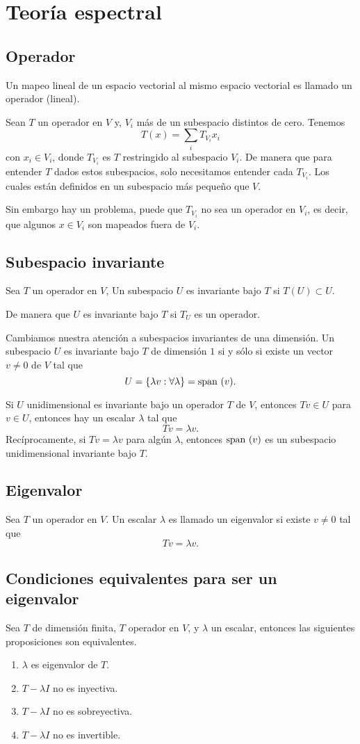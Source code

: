 \documentclass{article}
\begin{document}
\section{Teoría espectral}
\subsection{Operador}
Un mapeo lineal de un espacio vectorial al mismo espacio 
vectorial es llamado un operador (lineal).

Sean $T$ un operador en $V$ y, $V_i$ más de un subespacio
distintos de cero. Tenemos
$$T(x) = \sum_i T_{V_i}x_i$$
con $x_i\in V_i$, donde $T_{V_i}$ es $T$ restringido al
subespacio $V_i$. De manera que para entender $T$ dados
estos subespacios, solo necesitamos entender cada $T_{V_i}$.
Los cuales están definidos en un subespacio más pequeño que
$V$.

Sin embargo hay un problema, puede que $T_{V_i}$ no sea un
operador en $V_i$, es decir, que algunos $x\in V_i$
son mapeados fuera de $V_i$.

\subsection{Subespacio invariante}
Sea $T$ un operador en $V$, Un subespacio $U$ es invariante
bajo $T$ si $T(U)\subset U$.

De manera que $U$ es invariante bajo $T$ si $T_U$ es un
operador.

Cambiamos nuestra atención a subespacios invariantes de una
dimensión. Un subespacio $U$ es invariante bajo $T$
de dimensión $1$
si y sólo si existe un vector $v\neq 0$ de $V$ tal que
$$U = \{\lambda v: \forall \lambda\} = \text{span }(v).$$

Si $U$ unidimensional es invariante bajo un operador $T$ de 
$V$, entonces $Tv\in U$ para $v\in U$, entonces hay un 
escalar $\lambda$ tal que 
$$Tv=\lambda v.$$
Recíprocamente, si $Tv=\lambda v$ para algún $\lambda$,
entonces $\text{span }(v)$ es un subespacio
unidimensional invariante bajo $T$.

\subsection{Eigenvalor}
Sea $T$ un operador en $V$. Un escalar $\lambda$ es llamado
un eigenvalor si existe $v\neq 0$ tal que
$$Tv=\lambda v.$$
\newpage

\subsection{Condiciones equivalentes para ser un eigenvalor}
Sea $T$ de dimensión finita, $T$ operador en $V$, y
$\lambda$ un escalar, entonces las siguientes proposiciones
 son equivalentes.
 \begin{enumerate}
    \item $\lambda$ es eigenvalor de $T$.
    \item $T-\lambda I$ no es inyectiva.
    \item $T -\lambda I$ no es sobreyectiva.
    \item $T -\lambda I$ no es invertible.
 \end{enumerate}
\end{document}
